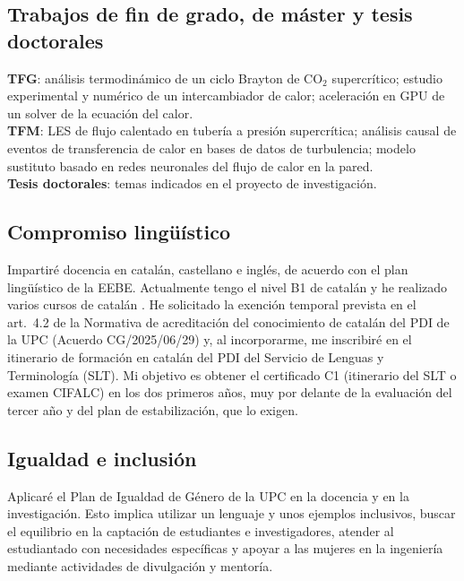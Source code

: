 \documentclass[11pt]{article}
\begin{document}
\subsection{Trabajos de fin de grado, de máster y tesis doctorales}\label{sec:theses}
\textbf{TFG}: análisis termodinámico de un ciclo Brayton de CO$_2$ supercrítico; estudio
experimental y numérico de un intercambiador de calor; aceleración en GPU de un solver de la
ecuación del calor.\\
\textbf{TFM}: LES de flujo calentado en tubería a presión supercrítica; análisis causal de
eventos de transferencia de calor en bases de datos de turbulencia; modelo sustituto basado
en redes neuronales del flujo de calor en la pared.\\
\textbf{Tesis doctorales}: temas indicados en el proyecto de investigación.

\subsection{Compromiso lingüístico}
Impartiré docencia en catalán, castellano e inglés, de acuerdo con el plan lingüístico de la
EEBE. Actualmente tengo el nivel B1 de catalán  y he realizado varios
cursos de catalán . He solicitado la exención temporal prevista en el
art.~4.2 de la Normativa de acreditación del conocimiento de catalán del PDI de la UPC (Acuerdo
CG/2025/06/29) y, al incorporarme, me inscribiré en el itinerario de formación en catalán del
PDI del Servicio de Lenguas y Terminología (SLT). Mi objetivo es obtener el certificado C1
(itinerario del SLT o examen CIFALC) en los dos primeros años, muy por delante de la
evaluación del tercer año y del plan de estabilización, que lo exigen.

\subsection{Igualdad e inclusión}
Aplicaré el Plan de Igualdad de Género de la UPC en la docencia y en la investigación. Esto
implica utilizar un lenguaje y unos ejemplos inclusivos, buscar el equilibrio en la
captación de estudiantes e investigadores, atender al estudiantado con necesidades
específicas y apoyar a las mujeres en la ingeniería mediante actividades de divulgación y
mentoría.

\end{document}
